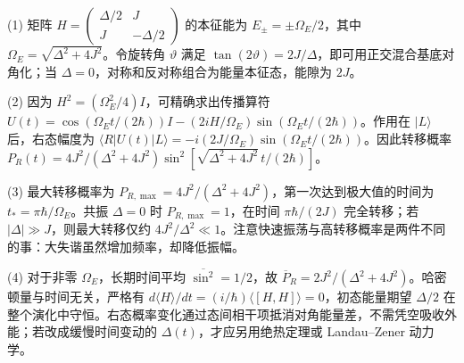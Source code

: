(1) 矩阵 \(H=\begin{pmatrix}\Delta/2&J\\J&-\Delta/2\end{pmatrix}\) 的本征能为 \(E_\pm=\pm\Omega_E/2\)，其中 \(\Omega_E=\sqrt{\Delta^2+4J^2}\)。令旋转角 \(\vartheta\) 满足 \(\tan(2\vartheta)=2J/\Delta\)，即可用正交混合基底对角化；当 \(\Delta=0\)，对称和反对称组合为能量本征态，能隙为 \(2J\)。

(2) 因为 \(H^2=(\Omega_E^2/4)I\)，可精确求出传播算符 \(U(t)=\cos(\Omega_Et/(2\hbar))I-(2iH/\Omega_E)\sin(\Omega_Et/(2\hbar))\)。作用在 \(|L\rangle\) 后，右态幅度为 \(\langle R|U(t)|L\rangle=-i(2J/\Omega_E)\sin(\Omega_Et/(2\hbar))\)。因此转移概率 \(P_R(t)=4J^2/(\Delta^2+4J^2)\sin^2[\sqrt{\Delta^2+4J^2}\,t/(2\hbar)]\)。

(3) 最大转移概率为 \(P_{R,\max}=4J^2/(\Delta^2+4J^2)\)，第一次达到极大值的时间为 \(t_*=\pi\hbar/\Omega_E\)。共振 \(\Delta=0\) 时 \(P_{R,\max}=1\)，在时间 \(\pi\hbar/(2J)\) 完全转移；若 \(|\Delta|\gg J\)，则最大转移仅约 \(4J^2/\Delta^2\ll1\)。注意快速振荡与高转移概率是两件不同的事：大失谐虽然增加频率，却降低振幅。

(4) 对于非零 \(\Omega_E\)，长期时间平均 \(\overline{\sin^2}=1/2\)，故 \(\overline P_R=2J^2/(\Delta^2+4J^2)\)。哈密顿量与时间无关，严格有 \(d\langle H\rangle/dt=(i/\hbar)\langle[H,H]\rangle=0\)，初态能量期望 \(\Delta/2\) 在整个演化中守恒。右态概率变化通过态间相干项抵消对角能量差，不需凭空吸收外能；若改成缓慢时间变动的 \(\Delta(t)\)，才应另用绝热定理或 Landau--Zener 动力学。
